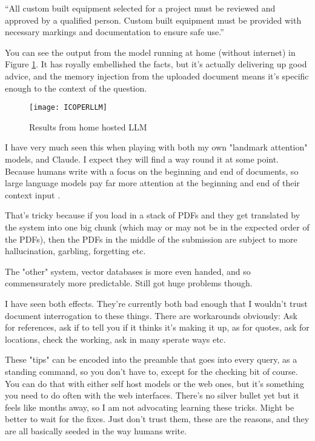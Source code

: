 \begin{tcolorbox}[enhanced, frame style={fill=lightgray}, interior style={fill=lightgray}]``All custom built equipment selected for a project must be reviewed and approved by a qualified person. Custom built equipment must be provided with necessary markings and documentation to ensure safe use.''
\end{tcolorbox}
You can see the output from the model running at home (without internet) in Figure \ref{fig:ICOPERLLM}. It has royally embellished the facts, but it's actually delivering up good advice, and the memory injection from the uploaded document means it's specific enough to the context of the question.
\begin{figure}[H]
    \centering
    \texttt{[image: ICOPERLLM]}
    \caption{Results from home hosted LLM}
    \label{fig:ICOPERLLM}
\end{figure}
I have very much seen this when playing with both my own "landmark attention" models, and Claude. I expect they will find a way round it at some point. Because humans write with a focus on the beginning and end of documents, so large language models pay far more attention at the beginning and end of their context input \cite{liu2023lost}. 

That's tricky because if  you load in a stack of PDFs and they get translated by the system into one big chunk (which may or may not be in the expected order of the PDFs), then the PDFs in the middle of the submission are subject to more hallucination, garbling, forgetting etc.

The "other" system, vector databases is more even handed, and so commensurately more predictable. Still got huge problems though. 

I have seen both effects. They're currently both bad enough that I wouldn't trust document interrogation to these things. There are workarounds obviously:
Ask for references, ask if to tell you if it thinks it's making it up, as for quotes, ask for locations, check the working, ask in many sperate ways etc.

These "tips" can be encoded into the preamble that goes into every query, as a standing command, so you don't have to, except for the checking bit of course.
You can do that with either self host models or the web ones, but it's something you need to do often with the web interfaces. There's no silver bullet yet but it feels like months away, so I am not advocating learning these tricks. Might be better to wait for the fixes. Just don't trust them, these are the reasons, and they are all basically seeded in the way humans write.

